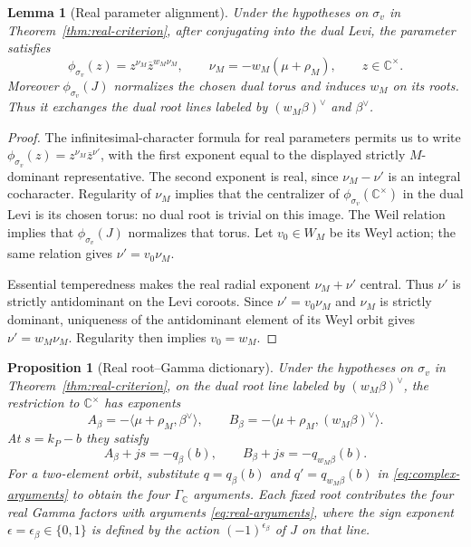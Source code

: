 \documentclass[12pt]{amsart}
\numberwithin{equation}{section}
\theoremstyle{plain}
\newtheorem{lemma}[theorem]{Lemma}
\newtheorem{proposition}[theorem]{Proposition}
\theoremstyle{definition}
\theoremstyle{remark}
\renewcommand{\bar}{\overline}
\newcommand{\C}{\mathbb C}
\begin{document}
\begin{lemma}[Real parameter alignment]\label{lem:alignment}
Under the hypotheses on $\sigma_v$ in Theorem~\ref{thm:real-criterion}, after conjugating into the dual Levi, the parameter satisfies
\[
 \phi_{\sigma_v}(z)=z^{\nu_M}\bar z^{w_M\nu_M},\qquad
 \nu_M=-w_M(\mu+\rho_M),\qquad z\in\C^\times.
\]
Moreover $\phi_{\sigma_v}(J)$ normalizes the chosen dual torus and induces $w_M$ on its roots. Thus it exchanges the dual root lines labeled by $(w_M\beta)^\vee$ and $\beta^\vee$.
\end{lemma}

\begin{proof}
The infinitesimal-character formula for real parameters \cite[\S2, Lemma~1]{NairPrasad2021} permits us to write $\phi_{\sigma_v}(z)=z^{\nu_M}\bar z^{\nu'}$, with the first exponent equal to the displayed strictly $M$-dominant representative. The second exponent is real, since $\nu_M-\nu'$ is an integral cocharacter. Regularity of $\nu_M$ implies that the centralizer of $\phi_{\sigma_v}(\C^\times)$ in the dual Levi is its chosen torus: no dual root is trivial on this image. The Weil relation implies that $\phi_{\sigma_v}(J)$ normalizes that torus. Let $v_0\in W_M$ be its Weyl action; the same relation gives $\nu'=v_0\nu_M$.

Essential temperedness makes the real radial exponent $\nu_M+\nu'$ central. Thus $\nu'$ is strictly antidominant on the Levi coroots. Since $\nu'=v_0\nu_M$ and $\nu_M$ is strictly dominant, uniqueness of the antidominant element of its Weyl orbit gives $\nu'=w_M\nu_M$. Regularity then implies $v_0=w_M$.
\end{proof}

\begin{proposition}[Real root--Gamma dictionary]\label{prop:real-dictionary}
Under the hypotheses on $\sigma_v$ in Theorem~\ref{thm:real-criterion}, on the dual root line labeled by $(w_M\beta)^\vee$, the restriction to $\C^\times$ has exponents
\[
 A_\beta=-\langle\mu+\rho_M,\beta^\vee\rangle,
 \qquad B_\beta=-\langle\mu+\rho_M,(w_M\beta)^\vee\rangle.
\]
At $s=k_P-b$ they satisfy
\begin{equation}\label{eq:exponents}
 A_\beta+js=-q_\beta(b),\qquad
 B_\beta+js=-q_{w_M\beta}(b).
\end{equation}
For a two-element orbit, substitute $q=q_\beta(b)$ and $q'=q_{w_M\beta}(b)$ in \eqref{eq:complex-arguments} to obtain the four $\Gamma_\C$ arguments. Each fixed root contributes the four real Gamma factors with arguments \eqref{eq:real-arguments}, where the sign exponent $\epsilon=\epsilon_\beta\in\{0,1\}$ is defined by the action $(-1)^{\epsilon_\beta}$ of $J$ on that line.
\end{proposition}
\end{document}
